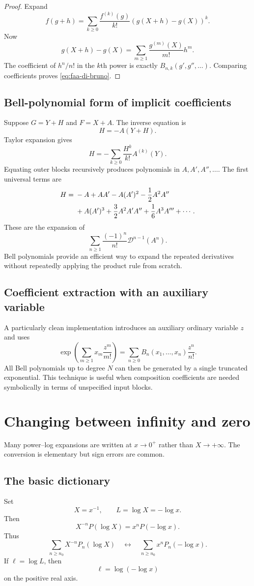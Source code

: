 \documentclass[11pt,oneside]{book}
\theoremstyle{definition}
\theoremstyle{remark}
\newcommand{\D}{\mathcal D}
\begin{document}
\begin{proof}
Expand
\[
 f(g+h)=\sum_{k\ge0}\frac{f^{(k)}(g)}{k!}
       (g(X+h)-g(X))^k.
\]
Now
\[
 g(X+h)-g(X)
 =\sum_{m\ge1}\frac{g^{(m)}(X)}{m!}h^m.
\]
The coefficient of $h^n/n!$ in the $k$th power is exactly
$B_{n,k}(g',g'',\ldots)$. Comparing coefficients proves
\eqref{eq:faa-di-bruno}.
\end{proof}

\section{Bell-polynomial form of implicit coefficients}
Suppose $G=Y+H$ and $F=X+A$. The inverse equation is
\[
 H=-A(Y+H).
\]
Taylor expansion gives
\[
 H=-\sum_{k\ge0}\frac{H^k}{k!}A^{(k)}(Y).
\]
Equating outer blocks recursively produces polynomials in
$A,A',A'',\ldots$. The first universal terms are
\begin{align}
 H={}&-A+AA'
 -A(A')^2-\frac12A^2A''\notag\\
 &+A(A')^3+\frac32A^2A'A''
 +\frac16A^3A'''+\cdots.
 \label{eq:universal-inverse-derivatives}
\end{align}
These are the expansion of
\[
 \sum_{n\ge1}\frac{(-1)^n}{n!}\D^{n-1}(A^n).
\]
Bell polynomials provide an efficient way to expand the repeated
derivatives without repeatedly applying the product rule from scratch.

\section{Coefficient extraction with an auxiliary variable}
A particularly clean implementation introduces an auxiliary ordinary
variable $z$ and uses
\[
 \exp\!\left(\sum_{m\ge1}x_m\frac{z^m}{m!}\right)
 =\sum_{n\ge0}B_n(x_1,\ldots,x_n)\frac{z^n}{n!}.
\]
All Bell polynomials up to degree $N$ can then be generated by a single
truncated exponential. This technique is useful when composition
coefficients are needed symbolically in terms of unspecified input blocks.

\chapter{Changing between infinity and zero}
\label{app:zero-infinity}

Many power--log expansions are written at $x\to0^+$ rather than
$X\to+\infty$. The conversion is elementary but sign errors are common.

\section{The basic dictionary}
Set
\[
 X=x^{-1},\qquad L=\log X=-\log x.
\]
Then
\begin{equation}\label{eq:zero-infinity-dictionary}
 X^{-n}P(\log X)
 =x^nP(-\log x).
\end{equation}
Thus
\[
 \sum_{n\ge n_0}X^{-n}P_n(\log X)
 \quad\longleftrightarrow\quad
 \sum_{n\ge n_0}x^nP_n(-\log x).
\]
If $\ell=\log L$, then
\[
 \ell=\log(-\log x)
\]
on the positive real axis.
\end{document}
